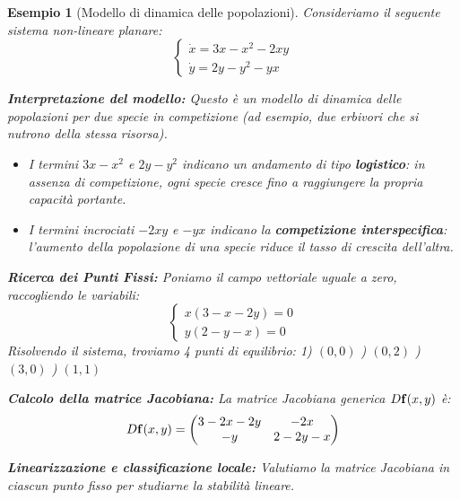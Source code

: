 \documentclass[openany]{book}
\newtheorem*{esempio}{Esempio}
\theoremstyle{definition}
\theoremstyle{remark}
\begin{document}
\begin{esempio}[Modello di dinamica delle popolazioni]
Consideriamo il seguente sistema non-lineare planare:
\begin{equation*}
    \begin{cases}
        \dot{x} = 3x - x^2 - 2xy \\
        \dot{y} = 2y - y^2 - yx
    \end{cases}
\end{equation*}

\textbf{Interpretazione del modello:}
Questo è un modello di dinamica delle popolazioni per due specie in competizione (ad esempio, due erbivori che si nutrono della stessa risorsa).
\begin{itemize}
    \item I termini $3x - x^2$ e $2y - y^2$ indicano un andamento di tipo \textbf{logistico}: in assenza di competizione, ogni specie cresce fino a raggiungere la propria capacità portante.
    \item I termini incrociati $-2xy$ e $-yx$ indicano la \textbf{competizione interspecifica}: l'aumento della popolazione di una specie riduce il tasso di crescita dell'altra.
\end{itemize}

\textbf{Ricerca dei Punti Fissi:}
Poniamo il campo vettoriale uguale a zero, raccogliendo le variabili:
\begin{equation*}
    \begin{cases}
        x(3 - x - 2y) = 0 \\
        y(2 - y - x) = 0
    \end{cases}
\end{equation*}
Risolvendo il sistema, troviamo 4 punti di equilibrio:
1) $(0,0)$ ) $(0,2)$ ) $(3,0)$ ) $(1,1)$

\textbf{Calcolo della matrice Jacobiana:}
La matrice Jacobiana generica $D\vb{f}(x,y)$ è:
$$ D\vb{f}(x,y) = \begin{pmatrix} 3 - 2x - 2y & -2x \\ -y & 2 - 2y - x \end{pmatrix} $$

\textbf{Linearizzazione e classificazione locale:}
Valutiamo la matrice Jacobiana in ciascun punto fisso per studiarne la stabilità lineare.


\end{esempio}
\end{document}
